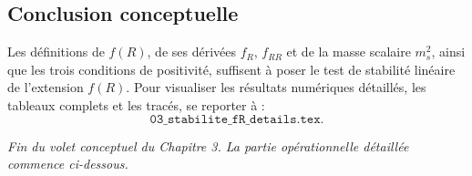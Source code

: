 \subsection{Conclusion conceptuelle}
Les définitions de \(f(R)\), de ses dérivées \(f_{R}\), \(f_{RR}\) et de la masse scalaire \(m_{s}^{2}\), ainsi que les trois conditions de positivité, suffisent à poser le test de stabilité linéaire de l’extension $f(R)$.
Pour visualiser les résultats numériques détaillés, les tableaux complets et les tracés, se reporter à :
\[
  \texttt{03\_stabilite\_fR\_details.tex}.
\]

\noindent\emph{Fin du volet conceptuel du Chapitre 3. La partie opérationnelle détaillée commence ci-dessous.}
